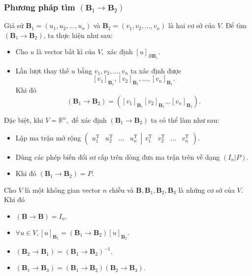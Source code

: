 \subsubsection{Phương pháp tìm $\left( {\mathbf{B}_1 \to \mathbf{B}_2} \right)$}
Giả sử ${\mathbf{B}_1} = \left( {{u_1},{u_2},...,{u_n}} \right)$ và ${\mathbf{B}_2} = \left( {{v_1},{v_2},...,{v_n}} \right)$ là hai cơ sở của $V.$ Để tìm $\left( {\mathbf{B}_1 \to \mathbf{B}_2} \right)$, ta thực hiện như sau:
\begin{itemize}
\item Cho $u$ là vector bất kì của $V,$ xác định ${\left[ u \right]_{{B\mathbf{B}_1}}}.$
\item Lần lượt thay thế $u$ bằng $v_1, v_2, ..., v_n$ ta xác định được
$${\left[ {{v_1}} \right]}_{\mathbf{B}_1}, {\left[ {{v_2}} \right]}_{\mathbf{B}_1}, ..., {\left[ {{v_n}} \right]}_{\mathbf{B}_1}.$$
Khi đó $$\left( {\mathbf{B}_1 \to \mathbf{B}_2} \right) = \left( {{{\left[ {{v_1}} \right]}_{\mathbf{B}_1}}{{\left[ {{v_2}} \right]}_{\mathbf{B}_1}}...{{\left[ {{v_n}} \right]}_{\mathbf{B}_1}}} \right).$$
\end{itemize}
Đặc biệt, khi $V = \mathbb{R}^n,$ để xác định $\left( {\mathbf{B}_1 \to \mathbf{B}_2} \right)$ ta có thể làm như sau:
\begin{itemize}
\item Lập ma trận mở rộng $\left( {\left. {\begin{array}{*{20}{c}}
  {u_1^{\mathrm{T}}}&{u_2^{\mathrm{T}}}&{...}&{u_n^{\mathrm{T}}} 
\end{array}} \right|\begin{array}{*{20}{c}}
  {v_1^{\mathrm{T}}}&{v_2^{\mathrm{T}}}&{...}&{v_n^{\mathrm{T}}} 
\end{array}} \right).$
\item Dùng các phép biến đổi sơ cấp trên dòng đưa ma trận trên về dạng $\left( {\left. {{I_n}} \right|P} \right).$
\item Khi đó $\left( {\mathbf{B}_1 \to \mathbf{B}_2} \right) = P.$
\end{itemize}
\begin{mybox}
\begin{theorem}
Cho $V$ là một không gian vector $n$ chiều và $\mathbf{B}, \mathbf{B}_1, \mathbf{B}_2, \mathbf{B}_3$ là những cơ sở của $V.$ Khi đó
\begin{itemize}
\item $\left( {\mathbf{B} \to \mathbf{B}} \right) = {I_n}.$
\item $\forall u \in V,{\left[ u \right]_{{\mathbf{B}_1}}} = \left( {{\mathbf{B}_1} \to {\mathbf{B}_2}} \right){\left[ u \right]_{{\mathbf{B}_2}}}.$
\item $\left( {{\mathbf{B}_2} \to {\mathbf{B}_1}} \right) = {\left( {{\mathbf{B}_1} \to {\mathbf{B}_2}} \right)^{ - 1}}.$
\item $\left( {{\mathbf{B}_1} \to {\mathbf{B}_3}} \right) = \left( {{\mathbf{B}_1} \to {\mathbf{B}_2}} \right)\left( {{\mathbf{B}_2} \to {\mathbf{B}_3}} \right).$
\end{itemize}
\end{theorem}
\end{mybox}
